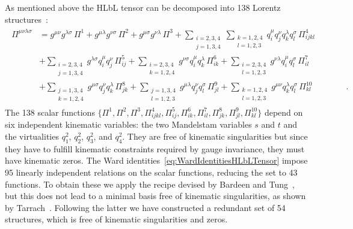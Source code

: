 \documentclass[epj]{webofc}
\newcommand{\<}{\langle}
\renewcommand{\>}{\rangle}
\begin{document}
As mentioned above the HLbL tensor can be decomposed into 138 Lorentz
structures~\cite{Karplus:1950zza, Leo:1975fb, Bijnens:1996wm}: 
\begin{align}
	\begin{split}
		\label{eq:HLbLTensor138StructuresLSM}
		\Pi^{\mu\nu\lambda\sigma} &= g^{\mu\nu} g^{\lambda\sigma} \, \Pi^1 + g^{\mu\lambda} g^{\nu\sigma} \, \Pi^2 + g^{\mu\sigma} g^{\nu\lambda} \, \Pi^3 
			+ \sum_{\substack{i=2,3,4 \\ j=1,3,4}}
                        \sum_{\substack{k=1,2,4 \\ l=1,2,3}} q_i^\mu
                        q_j^\nu q_k^\lambda q_l^\sigma \, \Pi^4_{ijkl}  \\
			&  +
                        \sum_{\substack{i=2,3,4 \\ j=1,3,4}}
                        g^{\lambda\sigma} q_i^\mu q_j^\nu \, \Pi^5_{ij} + \sum_{\substack{i=2,3,4 \\ k=1,2,4}} g^{\nu\sigma} q_i^\mu q_k^\lambda \, \Pi^6_{ik} + \sum_{\substack{i=2,3,4 \\ l=1,2,3}} g^{\nu\lambda} q_i^\mu q_l^\sigma \, \Pi^7_{il}  \\
			& + \sum_{\substack{j=1,3,4 \\ k=1,2,4}}
                        g^{\mu\sigma} q_j^\nu q_k^\lambda \, \Pi^8_{jk} +
                        \sum_{\substack{j=1,3,4 \\ l=1,2,3}} g^{\mu\lambda}
                        q_j^\nu q_l^\sigma \, \Pi^9_{jl} + \sum_{\substack{k=1,2,4 \\ l=1,2,3}} g^{\mu\nu}
                        q_k^\lambda q_l^\sigma \, \Pi^{10}_{kl} \qquad
                        \qquad . 
	\end{split}
\end{align}
The 138 scalar functions $\{ \Pi^1, \Pi^2, \Pi^3, \Pi^4_{ijkl}, \Pi^5_{ij},
\Pi^6_{ik}, \Pi^7_{il}, \Pi^8_{jk}, \Pi^9_{jl}, \Pi^{10}_{kl}\} $
depend on six independent kinematic variables: the two Mandelstam variables
$s$ and $t$ and the virtualities $q_1^2$, $q_2^2$, $q_3^2$, and
$q_4^2$. They are free of kinematic singularities but since they have to
fulfill kinematic constraints required by gauge invariance, they must have
kinematic zeros. The Ward identities~\eqref{eq:WardIdentitiesHLbLTensor} impose
95 linearly independent relations on the scalar functions, reducing the set
to 43 functions. To obtain these we apply the recipe devised by Bardeen and
Tung~\cite{Bardeen:1969aw}, but this does not lead to a minimal
basis free of kinematic singularities, as shown by
Tarrach~\cite{Tarrach:1975tu}. Following the latter we have constructed a
redundant set of 54 structures, which is free of kinematic 
singularities and zeros.
\end{document}
